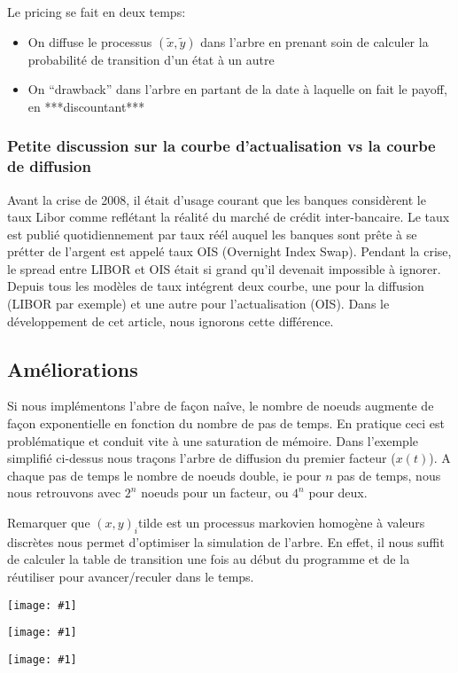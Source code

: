 \documentclass[paper=a4, fontsize=11pt]{scrartcl}
\numberwithin{equation}{section}		%
\numberwithin{figure}{section}			%
\numberwithin{table}{section}				%
\theoremstyle{definition}
\newcommand{\IMG}[3]{
  \begin{center}
    \texttt{[image: \#1]}%
    \end{center}
}
\begin{document}
Le pricing se fait en deux temps:
\begin{itemize}
\item On diffuse le processus $(\widetilde{x}, \widetilde{y})$ dans l'arbre en prenant soin de calculer la probabilité de transition d'un état à un autre
\item On ``drawback'' dans l'arbre en partant de la date à laquelle on fait le payoff, en ***discountant***
\end{itemize}

  \subsubsection*{Petite discussion sur la courbe d'actualisation vs la courbe de diffusion}
  Avant la crise de 2008, il était d'usage courant que les banques considèrent le taux Libor comme reflétant la réalité du marché de crédit inter-bancaire. Le taux est publié quotidiennement par
taux réél auquel les banques sont prête à se prétter de l'argent est appelé taux OIS (Overnight Index Swap).  
Pendant la crise, le spread entre LIBOR et OIS était si grand qu'il devenait impossible à ignorer. Depuis tous les modèles de taux intégrent deux courbe, une pour la diffusion (LIBOR par exemple) et une autre pour l'actualisation (OIS).
Dans le développement de cet article, nous ignorons cette différence.
  
\subsection{Améliorations}
Si nous implémentons l'abre de façon naîve, le nombre de noeuds augmente de façon exponentielle en fonction du nombre de pas de temps. En pratique ceci est problématique et conduit vite à une saturation de mémoire. Dans l'exemple simplifié ci-dessus nous traçons l'arbre de diffusion du premier facteur ($x(t)$). A chaque pas de temps le nombre de noeuds double, ie pour $n$ pas de temps, nous nous retrouvons avec $2^n$ noeuds pour un facteur, ou $4^n$ pour deux. 

Remarquer que $(x, y)_i$tilde est un processus markovien homogène à valeurs discrètes nous permet d'optimiser la simulation de l'arbre. En effet, il nous suffit de calculer la table de transition une fois au début du programme et de la réutiliser pour avancer/reculer dans le temps. 




\IMG{img/slice.png}{Slice}{0.5}
\IMG{img/pending.jpg}{Cache grind avant}{0.2}
\IMG{img/pending.jpg}{Cache grind avant}{0.2}
\end{document}
